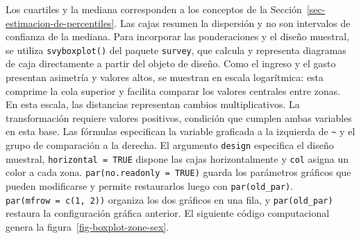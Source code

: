 \documentclass[
  spanish,
  11pt,
  letterpaper,
  oneside,
  open=any]{scrbook}
\begin{document}
Los cuartiles y la mediana corresponden a los conceptos de la
Sección~\ref{sec-estimacion-de-percentiles}. Las cajas resumen la
dispersión y no son intervalos de confianza de la mediana. Para
incorporar las ponderaciones y el diseño muestral, se utiliza
\texttt{svyboxplot()} del paquete \texttt{survey}, que calcula y
representa diagramas de caja directamente a partir del objeto de diseño.
Como el ingreso y el gasto presentan asimetría y valores altos, se
muestran en escala logarítmica: esta comprime la cola superior y
facilita comparar los valores centrales entre zonas. En esta escala, las
distancias representan cambios multiplicativos. La transformación
requiere valores positivos, condición que cumplen ambas variables en
esta base. Las fórmulas especifican la variable graficada a la izquierda
de \texttt{\textasciitilde{}} y el grupo de comparación a la derecha. El
argumento \texttt{design} especifica el diseño muestral,
\texttt{horizontal\ =\ TRUE} dispone las cajas horizontalmente y
\texttt{col} asigna un color a cada zona.
\texttt{par(no.readonly\ =\ TRUE)} guarda los parámetros gráficos que
pueden modificarse y permite restaurarlos luego con
\texttt{par(old\_par)}. \texttt{par(mfrow\ =\ c(1,\ 2))} organiza los
dos gráficos en una fila, y \texttt{par(old\_par)} restaura la
configuración gráfica anterior. El siguiente código computacional genera
la figura~\ref{fig-boxplot-zone-sex}.
\end{document}
